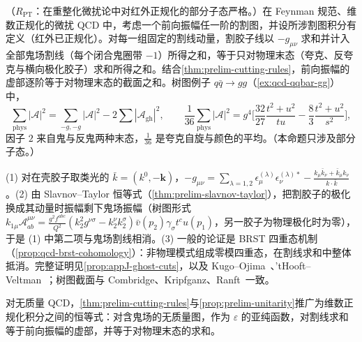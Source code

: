 \begin{proposition}\label{prop:prelim-unitarity}
（$R_{\mathrm{PT}}$：在重整化微扰论中对红外正规化的部分子态严格。）在 Feynman 规范、维数正规化的微扰 QCD 中，考虑一个前向振幅任一阶的割图，并设所涉割图积分有定义（红外已正规化）。对每一组固定的割线动量，割胶子线以 $-g_{\mu\nu}$ 求和并计入全部鬼场割线（每个闭合鬼圈带 $-1$）所得之和，等于只对物理末态（夸克、反夸克与横向极化胶子）求和所得之和。结合\cref{thm:prelim-cutting-rules}，前向振幅的虚部逐阶等于对物理末态的截面之和。树图例子 $q\bar q\to gg$（\cref{ex:qcd-qqbar-gg}）中，%
\begin{equation}\label{eq:prelim-qqgg}
\sum_{\mathrm{phys}}|\mathcal A|^2=\sum_{-g,-g}|\mathcal A|^2-2\sum|\mathcal A_{\mathrm{gh}}|^2,\qquad
\frac1{36}\sum_{\mathrm{phys}}|\mathcal A|^2=g^4\Big[\frac{32}{27}\frac{t^2+u^2}{tu}-\frac83\frac{t^2+u^2}{s^2}\Big],
\end{equation}
因子 $2$ 来自鬼与反鬼两种末态，$\frac1{36}$ 是夸克自旋与颜色的平均。（本命题只涉及部分子态。）
\end{proposition}

\begin{proofsketch}
(1) 对在壳胶子取类光的 $\bar k=(k^0,-\mathbf k)$，$-g_{\mu\nu}=\sum_{\lambda=1,2}\epsilon^{(\lambda)}_\mu\epsilon^{(\lambda)*}_\nu-\frac{k_\mu\bar k_\nu+\bar k_\mu k_\nu}{k\cdot\bar k}$。(2) 由 Slavnov--Taylor 恒等式（\cref{thm:prelim-slavnov-taylor}），把割胶子的极化换成其动量时振幅剩下鬼场振幅（树图形式 $k_{1\mu}\mathcal A^{\mu\nu}_{ab}=\frac{g^2f^{abc}}{Q^2}(k_2^2g^{\nu\sigma}-k_2^\nu k_2^\sigma)\bar v(p_2)\gamma_\sigma t^cu(p_1)$，另一胶子为物理极化时为零），于是 (1) 中第二项与鬼场割线相消。(3) 一般的论证是 BRST 四重态机制（\cref{prop:qcd-brst-cohomology}）：非物理模式组成零模四重态，在割线求和中整体抵消。完整证明见\cref{prop:appJ-ghost-cuts}，以及 Kugo--Ojima~\cite{KugoOjima1979}、'tHooft--Veltman~\cite{tHooftVeltman1972b}；树图截面与 Combridge、Kripfganz、Ranft~\cite{CombridgeKripfganzRanft1977}一致。
\end{proofsketch}

\begin{remark}\label{rem:prelim-cutting-dr}
对无质量 QCD，\cref{thm:prelim-cutting-rules}与\cref{prop:prelim-unitarity}推广为维数正规化积分之间的恒等式：对含鬼场的无质量图，作为 $\varepsilon$ 的亚纯函数，对割线求和等于前向振幅的虚部，并等于对物理末态的求和。
\end{remark}

